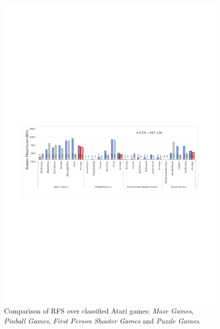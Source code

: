 \documentclass[letterpaper]{article} %
\begin{document}
\begin{figure}
	\begin{center}
		\centerline{\includegraphics[width=\columnwidth]{figure/figure-resn-2}}
		\caption{
                Comparison of RFS over classified Atari games: \textit{Maze Games}, \textit{Pinball Games}, \textit{First Person Shooter Games} and \textit{Puzzle Games}.
            }
		\label{figure-resn-2}
	\end{center}
\end{figure}
\end{document}
